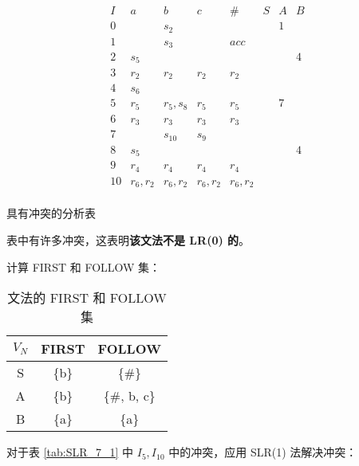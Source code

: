 \begin{enumerate}
    \begin{table}[H]
        \centering
        \begin{equation*}
            \begin{array}{c|cccc|ccc}
                I & a & b & c & \# & S & A & B \\
                \hline
                0 & & s_2 & & & & 1 & \\
                1 & & s_3 & & acc & & & \\
                2 & s_5 & & & & & & 4 \\
                3 & r_2 & r_2 & r_2 & r_2 & & & \\
                4 & s_6 & & & & & & \\
                5 & r_5 & r_5, s_8 & r_5 & r_5 & & 7 & \\
                6 & r_3 & r_3 & r_3 & r_3 & & & \\
                7 & & s_{10} & s_9 & & & & \\
                8 & s_5 & & & & & & 4 \\
                9 & r_4 & r_4 & r_4 & r_4 & & & \\
                10 & r_6, r_2 & r_6, r_2 & r_6, r_2 & r_6, r_2 & & & \\
            \end{array}
        \end{equation*}
        \caption{具有冲突的分析表}
        \label{tab:SLR_7_1}
    \end{table}
    
    表中有许多冲突，这表明\textbf{该文法不是 LR(0) 的}。
    
    计算 FIRST 和 FOLLOW 集：
    
    \begin{table}[H]
        \centering
        \begin{tabular}{c|cc}
            $V_N$ & FIRST & FOLLOW \\
            \hline
            S & \{b\} & \{\#\} \\
            A & \{b\} & \{\#, b, c\} \\
            B & \{a\} & \{a\} \\
        \end{tabular}
        \caption{文法的 FIRST 和 FOLLOW 集}
        \label{tab:FF_7}
    \end{table}
    
    对于表 \ref{tab:SLR_7_1} 中 $I_5, I_{10}$ 中的冲突，应用 SLR(1) 法解决冲突：
    

\end{enumerate}
